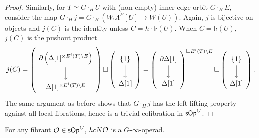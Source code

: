 \documentclass[a4paper,10pt
,draft
]{article}%
\renewcommand{\1}{\eta}%
\begin{document}
\begin{proof}
      Similarly, for $T \simeq G \cdot_H U$ with (non-empty) inner edge orbit $G \cdot_H E$, consider the map
      $G \cdot_H j = G \cdot_H \left( W_!\Lambda^E[U] \to W(U) \right)$.
      Again, $j$ is bijective on objects and $j(C)$ is the identity unless $C = h \cdot \mathsf{lr}(U)$.
      When $C = \mathsf{lr}(U)$, $j(C)$ is the pushout product
      \begin{equation}
            j(C) =
            \left(
                  \begin{tikzcd}
                        \partial \left(
                              \Delta[1]^{\times E^i(T) \setminus E}
                        \right) \arrow[d]
                        \\
                        \Delta[1]^{\times E^i(T) \setminus E}
                  \end{tikzcd}
            \right) \square
            \left(
                  \begin{tikzcd}
                        \set{1} \arrow[d]
                        \\
                        \Delta[1]
                  \end{tikzcd}
            \right)
            =
            \left(
                  \begin{tikzcd}
                        \partial \Delta[1] \arrow[d]
                        \\
                        \Delta[1]
                  \end{tikzcd}
            \right)^{\square E^i(T) \setminus E}
            \square
            \left(
                  \begin{tikzcd}
                        \set{1} \arrow[d]
                        \\
                        \Delta[1]
                  \end{tikzcd}
            \right).                              
      \end{equation}
      The same argument as before shows that $G \cdot_H j$ has the left lifting property against all local fibrations,
      hence is a trivial cofibration in $\mathsf{sOp}^G$.
\end{proof}

\begin{corollary}
      For any fibrant $\mathcal{O} \in \mathsf{sOp}^G$, $h c N \mathcal{O}$ is a $G$-$\infty$-operad.
\end{corollary}
\end{document}
